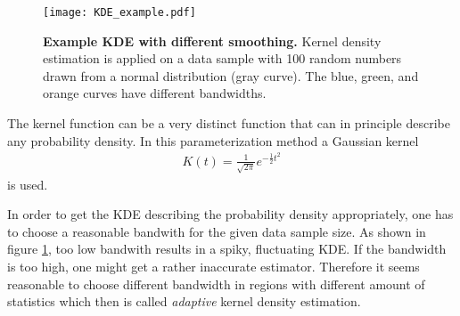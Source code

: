 \begin{figure}[h]
	\centering
	\texttt{[image: KDE\_example.pdf]}
	\caption[Example KDE with different smoothing]{\textbf{Example KDE with different smoothing.} \cite{kde:example_plot} Kernel density estimation is applied on a data sample with 100 random numbers drawn from a normal distribution (gray curve). The blue, green, and orange curves have different bandwidths.}
	\label{kde:example_1d}	
\end{figure}

The kernel function can be a very distinct function that can in principle describe any probability density. In this parameterization method a Gaussian kernel
\begin{align}
	K(t) = \frac{1}{\sqrt{2\pi}}e^{-\frac{1}{2}t^2}
\end{align}
is used.

In order to get the KDE describing the probability density appropriately, one has to choose a reasonable bandwith for the given data sample size. As shown in figure \ref{kde:example_1d}, too low bandwith results in a spiky, fluctuating KDE. If the bandwidth is too high, one might get a rather inaccurate estimator. Therefore it seems reasonable to choose different bandwidth in regions with different amount of statistics which then is called \textit{adaptive} kernel density estimation. \cite{kde:schoenen, kde:wangwang}

